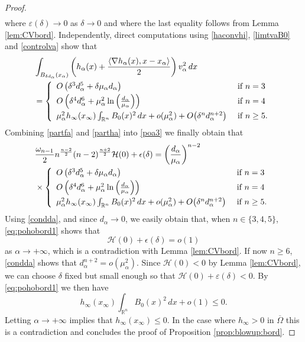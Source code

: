 \documentclass[10pt]{amsart}
\numberwithin{equation}{section}
\newcommand{\ve}{\varepsilon}
\newcommand{\Om}{\Omega}
\newcommand{\ma}{\mu_\alpha}
\def \rr {\mathbb{R}}
\def \ep{\epsilon}
\def \xl{x_\alpha}
\def \ma{\mu_{\alpha}}
\def \va{v_{\alpha}}
\def \ha{h_{\alpha}}
\def \hi{h_{\infty}}
\def \xin{x_{\infty}}
\def \r {\rangle}
\def \l{\langle}
\def \h{\mathcal{H}}
\def \da{d_{\alpha}}
\theoremstyle{plain}
\theoremstyle{remark}
\begin{document}
\begin{proof}
\begin{equation}
\begin{aligned}
\end{aligned}
\end{equation} 
where $\ve(\delta)\to 0$ as $\delta \to 0$ and where the last equality follows from Lemma \ref{lem:CVbord}. Independently, direct computations using \eqref{haconvhi}, \eqref{limtvaB0} and  \eqref{controlva} show that 
\begin{equation} \label{partha}
\begin{aligned}
&	\int_{B_{\delta\da}(\xl)}\left(\ha(x)+\frac{\l\nabla \ha(x),x-\xl \r}{2} \right)  \va^2\, dx\\
&=	\left\{\begin{array}{ll}
	\vspace{0.1cm}O\left(\delta^3 \da^5+\delta \ma \da\right) &\hbox{ if } n=3\\
	\vspace{0.1cm}	O\left(\delta^4 \da^6+\ma^2\ln\left( \frac{\da}{\ma}\right) \right) &\hbox{ if } n=4\\
\ma^2 \hi(\xin) \int_{\rr^n} B_0(x)^2\, dx +o(\ma^2) + O \big(\delta^n d_\alpha^{n+2}\big)  &\hbox{ if } n\geq 5.
\end{array}\right.
\end{aligned}
\end{equation}
Combining \eqref{partfa} and  \eqref{partha} into \eqref{poa3} we finally obtain that 
\begin{equation} \label{eq:pohobord1}
\begin{aligned}
&\frac{\omega_{n-1}}{2} n^{\frac{n-2}{2}} (n-2)^{\frac{n+2}{2}}\h(0)+\ep(\delta) =	\left( \frac{\da}{\ma}\right)^{n-2} \\
& \times \left\{\begin{array}{ll}
	\vspace{0.1cm}O\left(\delta^3 \da^5+\delta \ma \da\right) &\hbox{ if } n=3\\
	\vspace{0.1cm}	O\left(\delta^4 \da^6+\ma^2\ln\left( \frac{\da}{\ma}\right) \right) &\hbox{ if } n=4\\
\ma^2 \hi(\xin) \int_{\rr^n} B_0(x)^2\, dx +o(\ma^2) + O \big(\delta^n d_\alpha^{n+2}\big)  &\hbox{ if } n\geq 5.
\end{array}\right.
\end{aligned}
\end{equation}
Using \eqref{condda}, and since $d_\alpha \to 0$, we easily obtain that, when $n \in \{3,4,5\}$, \eqref{eq:pohobord1} shows that 
$$ \h(0)+\ep(\delta) = o(1) $$
as $\alpha \to + \infty$, which is a contradiction with Lemma \ref{lem:CVbord}. If now $n \ge 6$, \eqref{condda} shows that $ d_{\alpha}^{n+2} = o (\ma^2)$. Since $\h(0) <0$ by Lemma \ref{lem:CVbord}, we can choose $\delta$ fixed but small enough so that $\h(0) + \ve(\delta) <0$. By \eqref{eq:pohobord1} we then have 
$$ \hi(\xin) \int_{\rr^n} B_0(x)^2\, dx + o(1) \le 0. $$
Letting $\alpha \to + \infty$ implies that $ \hi(\xin) \le 0$. In the case where $h_\infty >0$ in $\overline{\Om}$ this is a contradiction and concludes the proof of Proposition \ref{prop:blowup:bord}. 


\end{proof}
\end{document}
